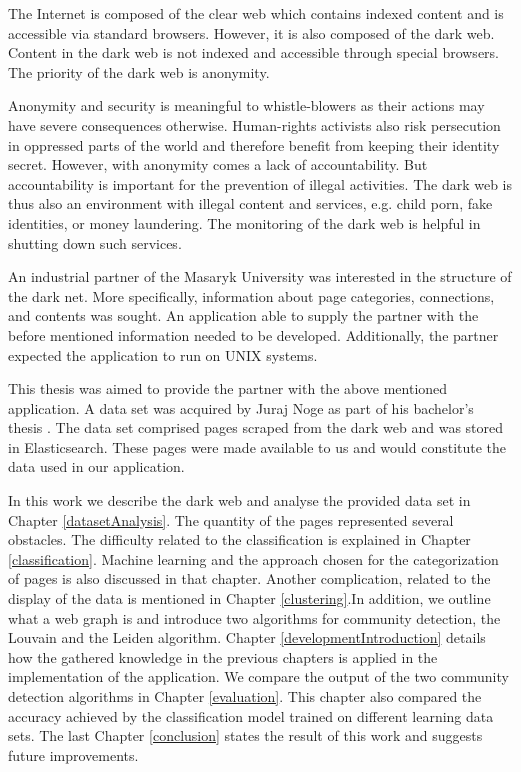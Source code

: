 \label{introduction}
The Internet is composed of the clear web which contains indexed content and is accessible via standard browsers. However, it is also composed of the dark web. Content in the dark web is not indexed and accessible through special browsers. The priority of the dark web is anonymity.

Anonymity and security is meaningful to whistle-blowers as their actions may have severe consequences otherwise. Human-rights activists also risk persecution in oppressed parts of the world and therefore benefit from keeping their identity secret. However, with anonymity comes a lack of accountability. But accountability is important for the prevention of illegal activities. The dark web is thus also an environment with illegal content and services, e.g. child porn, fake identities, or money laundering. The monitoring of the dark web is helpful in shutting down such services.

An industrial partner of the Masaryk University was interested in the structure of the dark net. More specifically, information about page categories, connections, and contents was sought. An application able to supply the partner with the before mentioned information needed to be developed. Additionally, the partner expected the application to run on UNIX systems.

This thesis was aimed to provide the partner with the above mentioned application. A data set was acquired by Juraj Noge as part of his bachelor's thesis \cite{bcScraping}. The data set comprised pages scraped from the dark web and was stored in Elasticsearch. These pages were made available to us and would constitute the data used in our application.

In this work we describe the dark web and analyse the provided data set in Chapter \ref{datasetAnalysis}. The quantity of the pages represented several obstacles. The difficulty related to the classification is explained in Chapter \ref{classification}. Machine learning and the approach chosen for the categorization of pages is also discussed in that chapter. Another complication, related to the display of the data is mentioned in Chapter \ref{clustering}.In addition, we outline what a web graph is and introduce two algorithms for community detection, the Louvain and the Leiden algorithm. Chapter \ref{developmentIntroduction} details how the gathered knowledge in the previous chapters is applied in the implementation of the application. We compare the output of the two community detection algorithms in Chapter \ref{evaluation}. This chapter also compared the accuracy achieved by the classification model trained on different learning data sets. The last Chapter \ref{conclusion} states the result of this work and suggests future improvements.

